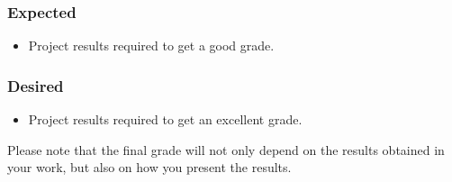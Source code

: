 \documentclass[thesis]{mas_proposal}
\begin{document}
\subsubsection*{Expected}
\begin{itemize}
    \item Project results required to get a good grade.
\end{itemize}

\subsubsection*{Desired}
\begin{itemize}
    \item Project results required to get an excellent grade.
\end{itemize}

Please note that the final grade will not only depend on the results obtained in your work, but also on how you present the results.

\nocite{*}

\end{document}
